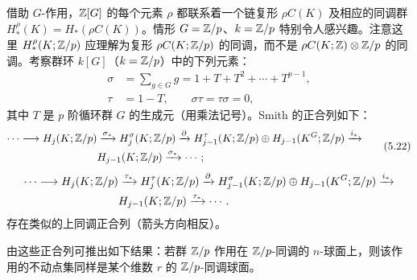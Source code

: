 借助 $G$-作用，$\mathbb{Z}[G]$ 的每个元素 $\rho$ 都联系着一个链复形 $\rho C(K)$ 及相应的同调群 $H^\rho_*(K)=H_*(\rho C(K))$。情形 $G=\mathbb{Z}/p$、$k=\mathbb{Z}/p$ 特别令人感兴趣。注意这里 $H^\rho_*(K;\mathbb{Z}/p)$ 应理解为复形 $\rho C(K;\mathbb{Z}/p)$ 的同调，而不是 $\rho C(K;\mathbb{Z})\otimes\mathbb{Z}/p$ 的同调。考察群环 $k[G]$（$k=\mathbb{Z}/p$）中的下列元素：
\begin{equation}
\begin{aligned}
  \sigma&=\sum_{g\in G}g=1+T+T^2+\cdots+T^{p-1},\\
  \tau&=1-T,\qquad \sigma\tau=\tau\sigma=0,
\end{aligned}\tag{5.21}
\end{equation}
其中 $T$ 是 $p$ 阶循环群 $G$ 的生成元（用乘法记号）。Smith 的正合列如下：
\begin{equation}
\begin{aligned}
  \cdots\longrightarrow H_j(K;\mathbb{Z}/p)&\xrightarrow{\sigma_*}H^\sigma_j(K;\mathbb{Z}/p)\xrightarrow{\partial}H^\tau_{j-1}(K;\mathbb{Z}/p)\oplus H_{j-1}(K^G;\mathbb{Z}/p)\xrightarrow{i_*}\\
  &H_{j-1}(K;\mathbb{Z}/p)\xrightarrow{\sigma_*}\cdots;
\end{aligned}\tag{5.22}
\end{equation}
\[
\begin{aligned}
  \cdots\longrightarrow H_j(K;\mathbb{Z}/p)&\xrightarrow{\tau_*}H^\tau_j(K;\mathbb{Z}/p)\xrightarrow{\partial}H^\sigma_{j-1}(K;\mathbb{Z}/p)\oplus H_{j-1}(K^G;\mathbb{Z}/p)\xrightarrow{i_*}\\
  &H_{j-1}(K;\mathbb{Z}/p)\xrightarrow{\tau_*}\cdots.
\end{aligned}
\]
存在类似的上同调正合列（箭头方向相反）。

由这些正合列可推出如下结果：若群 $\mathbb{Z}/p$ 作用在 $\mathbb{Z}/p$-同调的 $n$-球面上，则该作用的不动点集同样是某个维数 $r$ 的 $\mathbb{Z}/p$-同调球面。

